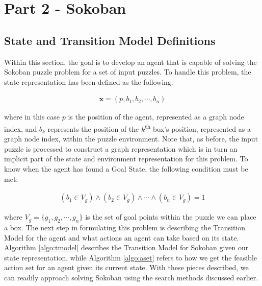 \documentclass{article}[12pt]
\begin{document}
   
   \newpage
   \section{Part 2 - Sokoban}
   \subsection{State and Transition Model Definitions}
   Within this section, the goal is to develop an agent that is capable of solving the Sokoban puzzle problem for a set of input puzzles. To handle this problem, the state representation has been defined as the following:
   
   \begin{align*}
   \boldsymbol{x} = \left( p, b_1, b_2, \cdots, b_n \right)
   \end{align*}
   
   where in this case $p$ is the position of the agent, represented as a graph node index, and $b_k$ represents the position of the $k$\textsuperscript{th} box's position, represented as a graph node index, within the puzzle environment. Note that, as before, the input puzzle is processed to construct a graph representation which is in turn an implicit part of the state and environment representation for this problem. To know when the agent has found a Goal State, the following condition must be met:
   
   \begin{align*}
   \left(b_1 \in V_g \right) \wedge \left(b_2 \in V_g \right) \wedge \cdots \wedge \left(b_n \in V_g \right) = 1
   \end{align*}
   
   where $V_g = \lbrace g_1, g_2, \cdots, g_n\rbrace$ is the set of goal points within the puzzle we can place a box. The next step in formulating this problem is describing the Transition Model for the agent and what actions an agent can take based on its state. Algorithm \ref{algo:tmodel} describes the Transition Model for Sokoban given our state representation, while Algorithm \ref{algo:aset} refers to how we get the feasible action set for an agent given its current state. With these pieces described, we can readily approach solving Sokoban using the search methods discussed earlier.
   
\end{document}

